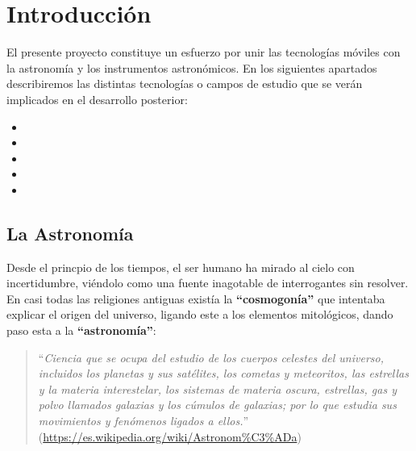 \chapter{Introducción}

El presente proyecto constituye un esfuerzo por unir las tecnologías móviles con la astronomía y los instrumentos astronómicos. En los siguientes apartados describiremos las distintas tecnologías o campos de estudio que se verán implicados en el desarrollo posterior:

\begin{itemize}
  \item {}
  \item {}
  \item {}
  \item {}
  \item {}
\end{itemize}

\section{La Astronomía}

Desde el princpio de los tiempos, el ser humano ha mirado al cielo con incertidumbre, viéndolo como una fuente inagotable de interrogantes sin resolver. En casi todas las religiones antiguas existía la \textbf{``cosmogonía''} que intentaba explicar el origen del universo, ligando este a los elementos mitológicos, dando paso esta a la \textbf{``astronomía''}:

\begin{quote}``\textit{Ciencia que se ocupa del estudio de los cuerpos celestes del universo, incluidos los planetas y sus satélites, los cometas y meteoritos, las estrellas y la materia interestelar, los sistemas de materia oscura, estrellas, gas y polvo llamados galaxias y los cúmulos de galaxias; por lo que estudia sus movimientos y fenómenos ligados a ellos.}''
\newline(\url{https://es.wikipedia.org/wiki/Astronom%C3%ADa})
\end{quote}

